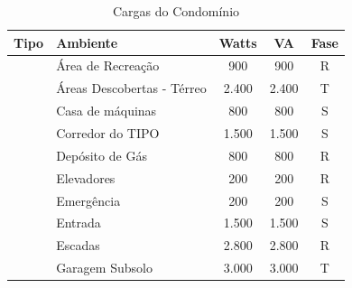 \documentclass[12pt,openright,oneside,a4paper,brazil]{abntex2}
\begin{document}
\begin{table}[H]
\centering
\caption{Cargas do Condomínio}
\label{tab:cargas_condominio}
\renewcommand{\arraystretch}{1.15} %

    \begin{tabular}{cllccc}
        \toprule
        \textbf{Tipo}                            & \multicolumn{2}{l}{\textbf{Ambiente}}                                              & \textbf{Watts} & \textbf{VA}    & \textbf{Fase} \\ \midrule
                                                & \multicolumn{2}{l}{Área de Recreação}                                              & 900            & 900            & R             \\
                                                & \multicolumn{2}{l}{Áreas Descobertas - Térreo}                                     & 2.400          & 2.400          & T             \\
                                                & \multicolumn{2}{l}{Casa de máquinas}                                               & 800            & 800            & S             \\
                                                & \multicolumn{2}{l}{Corredor do TIPO}                                               & 1.500          & 1.500          & S             \\
                                                & \multicolumn{2}{l}{Depósito de Gás}                                                & 800            & 800            & R             \\
                                                & \multicolumn{2}{l}{Elevadores}                                                     & 200            & 200            & R             \\
                                                & \multicolumn{2}{l}{Emergência}                                                     & 200            & 200            & S             \\
                                                & \multicolumn{2}{l}{Entrada}                                                        & 1.500          & 1.500          & S             \\
                                                & \multicolumn{2}{l}{Escadas}                                                        & 2.800          & 2.800          & R             \\
                                                & \multicolumn{2}{l}{Garagem Subsolo}                                                & 3.000          & 3.000          & T             \\

\end{tabular}
\end{table}
\end{document}
